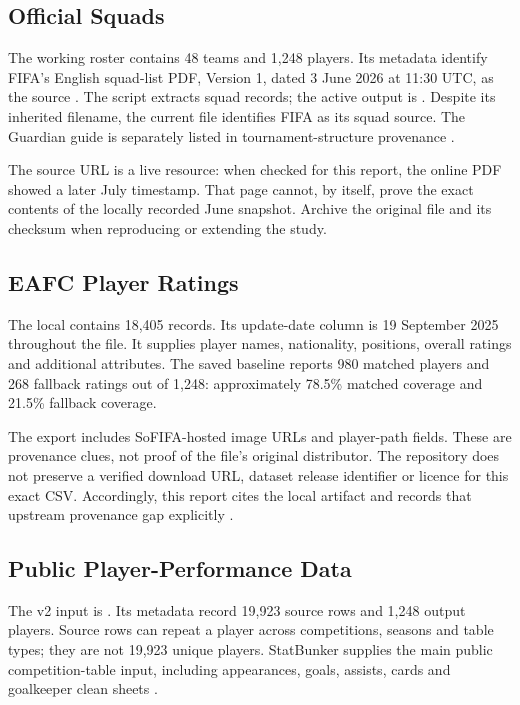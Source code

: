 \subsection{Official Squads}
The working roster contains 48 teams and 1,248 players. Its metadata identify
FIFA's English squad-list PDF, Version 1, dated 3 June 2026 at 11:30 UTC, as the
source \cite{data-fifa-squads}. The script
 extracts squad records; the active output
is . Despite its inherited
filename, the current file identifies FIFA as its squad source. The Guardian
guide is separately listed in tournament-structure provenance \cite{data-guardian}.

The source URL is a live resource: when checked for this report, the online PDF
showed a later July timestamp. That page cannot, by itself, prove the exact
contents of the locally recorded June snapshot. Archive the original file and
its checksum when reproducing or extending the study.
\subsection{EAFC Player Ratings}
The local  contains 18,405 records. Its update-date
column is 19 September 2025 throughout the file. It supplies player names,
nationality, positions, overall ratings and additional attributes. The saved
baseline reports 980 matched players and 268 fallback ratings out of 1,248:
approximately 78.5\% matched coverage and 21.5\% fallback coverage.

The export includes SoFIFA-hosted image URLs and player-path fields. These are
provenance clues, not proof of the file's original distributor. The repository
does not preserve a verified download URL, dataset release identifier or licence
for this exact CSV. Accordingly, this report cites the local artifact and
records that upstream provenance gap explicitly \cite{data-eafc}.
\subsection{Public Player-Performance Data}
The v2 input is . Its metadata
record 19,923 source rows and 1,248 output players. Source rows can repeat a
player across competitions, seasons and table types; they are not 19,923 unique
players. StatBunker supplies the main public competition-table input, including
appearances, goals, assists, cards and goalkeeper clean sheets \cite{data-statbunker}.

